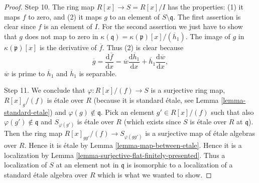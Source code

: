 \begin{proof}
\medskip\noindent
Step 10. The ring map $R[x] \to S = R[x]/I$ has the properties:
(1) it maps $f$ to zero, and
(2) it maps $g$ to an element of $S \setminus \mathfrak q$.
The first assertion is clear since $f$ is an element of $I$.
For the second assertion we just have to show that $g$ does
not map to zero in
$\kappa(\mathfrak q) = \kappa(\mathfrak p)[x]/(\overline{h}_1)$.
The image of $g$ in $\kappa(\mathfrak p)[x]$ is the derivative
of $\overline{f}$. Thus (2) is clear because
$$
\overline{g} =
\frac{\text{d}\overline{f}}{\text{d}x} =
\overline{w}\frac{\text{d}\overline{h}_1}{\text{d}x} +
\overline{h}_1\frac{\text{d}\overline{w}}{\text{d}x},
$$
$\overline{w}$ is prime to $\overline{h}_1$ and
$\overline{h}_1$ is separable.

\medskip\noindent
Step 11.
We conclude that $\varphi : R[x]/(f) \to S$ is a surjective ring map,
$R[x]_g/(f)$ is \'etale over $R$ (because it is standard \'etale,
see Lemma \ref{lemma-standard-etale}) and $\varphi(g) \not \in \mathfrak q$.
Pick an element $g' \in R[x]/(f)$ such that
also $\varphi(g') \not \in \mathfrak q$ and $S_{\varphi(g')}$
is \'etale over $R$ (which exists since $S$ is \'etale over $R$ at
$\mathfrak q$). Then the ring map
$R[x]_{gg'}/(f) \to S_{\varphi(gg')}$ is a surjective map of \'etale
algebras over $R$. Hence it is \'etale by Lemma \ref{lemma-map-between-etale}.
Hence it is a localization by
Lemma \ref{lemma-surjective-flat-finitely-presented}.
Thus a localization of $S$ at an element not in $\mathfrak q$ is
isomorphic to a localization of a standard \'etale algebra over $R$
which is what we wanted to show.
\end{proof}